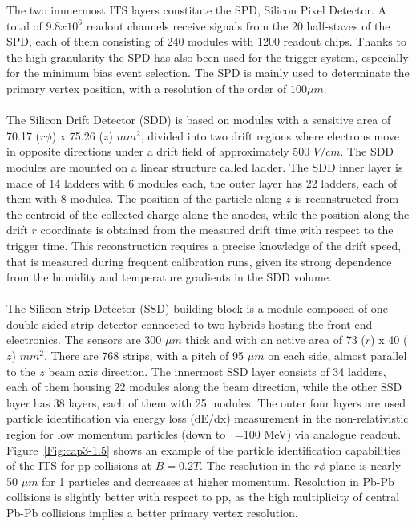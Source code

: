 The two innnermost ITS layers constitute the SPD, Silicon Pixel Detector. A total of $9.8 x10^{6}$ readout channels receive signals from the 20 half-staves of the SPD, each of them consisting of 240 modules with 1200 readout chips. Thanks to the high-granularity the SPD has also been used for the trigger system, especially for the minimum bias event selection. The SPD is mainly used to determinate the primary vertex position, with a resolution of the order of $100 \mu m$.\\
\\
The Silicon Drift Detector (SDD) is based on modules with a sensitive area of 70.17 ($r\phi$) x 75.26 ($z$) $mm^2$, divided into two drift regions where electrons move in opposite directions under a drift field of approximately 500 $V/cm$. The SDD modules are mounted on a linear structure called ladder. The SDD inner layer is made of 14 ladders with 6 modules each, the outer layer has 22 ladders, each of them with 8 modules. The position of the particle along $z$ is reconstructed from the centroid of the collected charge along the anodes, while the position along the drift $r$ coordinate is obtained from the measured drift time with respect to the trigger time. This reconstruction requires a precise knowledge of the drift speed, that is measured during frequent calibration runs, given its strong dependence from the humidity and temperature gradients in the SDD volume.\\
\\
The Silicon Strip Detector (SSD) building block is a module composed of one double-sided strip detector connected to two hybrids hosting the front-end electronics. The sensors are 300 $\mu m$ thick and with an active area of 73 ($r$) x 40 ($z$) $mm^2$. There are 768 strips, with a pitch of 95 $\mu m$ on each side, almost parallel to the $z$ beam axis direction. The innermost SSD layer consists of 34 ladders, each of them housing 	22 modules along the beam direction, while the other SSD layer has 38 layers, each of them with 25 modules. The outer four layers are used particle identification via energy loss (dE/dx) measurement in the non-relativistic region for low momentum particles (down to \pT~=100 MeV) via analogue readout. \mbox{Figure \ref{Fig:cap3-1.5}} shows an example of the particle identification capabilities of the ITS for pp collisions at $B= 0.2 T$. The resolution in the $r\phi$ plane is nearly 50 $\mu m$ for 1 \GeVc particles and decreases at higher momentum. Resolution in Pb-Pb collisions is slightly better with respect to pp, as the high multiplicity of central Pb-Pb collisions implies a better primary vertex resolution.

